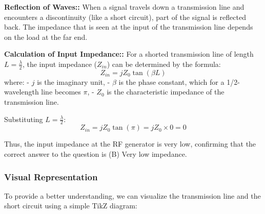 \textbf{Reflection of Waves::} When a signal travels down a transmission line and encounters a discontinuity (like a short circuit), part of the signal is reflected back. The impedance that is seen at the input of the transmission line depends on the load at the far end.

\textbf{Calculation of Input Impedance::} For a shorted transmission line of length \(L = \frac{\lambda}{2}\), the input impedance (\(Z_{in}\)) can be determined by the formula:
\[
Z_{in} = j Z_0 \tan(\beta L)
\]
where:
- \(j\) is the imaginary unit,
- \(\beta\) is the phase constant, which for a 1/2-wavelength line becomes \(\pi\),
- \(Z_0\) is the characteristic impedance of the transmission line.

Substituting \(L = \frac{\lambda}{2}\):
\[
Z_{in} = j Z_0 \tan\left(\pi\right) = jZ_0 \times 0 = 0
\]

Thus, the input impedance at the RF generator is very low, confirming that the correct answer to the question is (B) Very low impedance.

\subsubsection{Visual Representation}

To provide a better understanding, we can visualize the transmission line and the short circuit using a simple TikZ diagram:

\begin{center}
\end{center}
